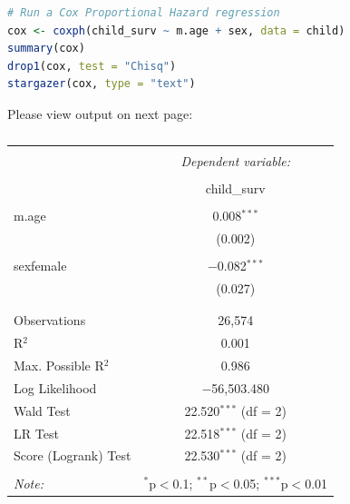\documentclass[12pt,letterpaper]{article}
\begin{document}
\begin{lstlisting}[language=R]
# Run a Cox Proportional Hazard regression
cox <- coxph(child_surv ~ m.age + sex, data = child)
summary(cox)
drop1(cox, test = "Chisq")
stargazer(cox, type = "text")

\end{lstlisting}

\noindent Please view output on next page: \\

\begin{table}[!htbp] \centering 
	\caption{} 
	\label{} 
	\begin{tabular}{@{\extracolsep{5pt}}lc} 
		\\[-1.8ex]\hline 
		\hline \\[-1.8ex] 
		& \multicolumn{1}{c}{\textit{Dependent variable:}} \\ 
		\cline{2-2} 
		\\[-1.8ex] & child\_surv \\ 
		\hline \\[-1.8ex] 
		m.age & 0.008$^{***}$ \\ 
		& (0.002) \\ 
		& \\ 
		sexfemale & $-$0.082$^{***}$ \\ 
		& (0.027) \\ 
		& \\ 
		\hline \\[-1.8ex] 
		Observations & 26,574 \\ 
		R$^{2}$ & 0.001 \\ 
		Max. Possible R$^{2}$ & 0.986 \\ 
		Log Likelihood & $-$56,503.480 \\ 
		Wald Test & 22.520$^{***}$ (df = 2) \\ 
		LR Test & 22.518$^{***}$ (df = 2) \\ 
		Score (Logrank) Test & 22.530$^{***}$ (df = 2) \\ 
		\hline 
		\hline \\[-1.8ex] 
		\textit{Note:}  & \multicolumn{1}{r}{$^{*}$p$<$0.1; $^{**}$p$<$0.05; $^{***}$p$<$0.01} \\ 
	\end{tabular} 
\end{table} 

\vspace{.10cm}
\end{document}
